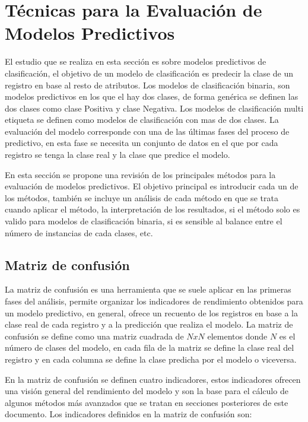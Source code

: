 \section{Técnicas para la Evaluación de Modelos Predictivos}


El estudio que se realiza en esta sección es sobre modelos predictivos de clasificación, el objetivo de un modelo de clasificación es predecir la clase de un registro en base al resto de atributos. Los modelos de clasificación binaria, son modelos predictivos en los que el hay dos clases, de forma genérica se definen las dos clases como clase Positiva y clase Negativa. Los modelos de clasificación multi etiqueta se definen como modelos de clasificación con mas de dos clases. La evaluación del modelo corresponde con una de las últimas fases del proceso de predictivo, en esta fase se necesita un conjunto de datos en el que por cada registro se tenga la clase real y la clase que predice el modelo.

\bigbreak

En esta sección se propone una revisión de los principales métodos para la evaluación de modelos predictivos. El objetivo principal es introducir cada un de los métodos, también se incluye un análisis de cada método en que se trata cuando aplicar el método, la interpretación de los resultados, si el método solo es valido para modelos de clasificación binaria, si es sensible al balance entre el número de instancias de cada clases, etc.

\subsection{Matriz de confusión}

La matriz de confusión es una herramienta que se suele aplicar en las primeras fases del análisis, permite organizar los indicadores de rendimiento obtenidos para un modelo predictivo, en general, ofrece un recuento de los registros en base a la clase real de cada registro y a la predicción que realiza el modelo. La matriz de confusión se define como una matriz cuadrada de $NxN$ elementos donde $N$ es el número de clases del modelo, en cada fila de la matriz se define la clase real del registro y en cada columna se define la clase predicha por el modelo o viceversa.

\bigbreak

En la matriz de confusión se definen cuatro indicadores, estos indicadores ofrecen una visión general del rendimiento del modelo y son la base para el cálculo de algunos métodos más avanzados que se tratan en secciones posteriores de este documento. Los indicadores definidos en la matriz de confusión son:

